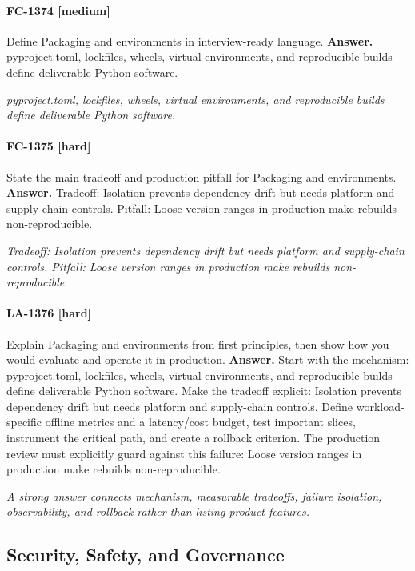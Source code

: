 \paragraph{FC-1374 [medium]} Define Packaging and environments in interview-ready language.
\noindent\textbf{Answer.} pyproject.toml, lockfiles, wheels, virtual environments, and reproducible builds define deliverable Python software.
\par\textit{pyproject.toml, lockfiles, wheels, virtual environments, and reproducible builds define deliverable Python software.}
\paragraph{FC-1375 [hard]} State the main tradeoff and production pitfall for Packaging and environments.
\noindent\textbf{Answer.} Tradeoff: Isolation prevents dependency drift but needs platform and supply-chain controls. Pitfall: Loose version ranges in production make rebuilds non-reproducible.
\par\textit{Tradeoff: Isolation prevents dependency drift but needs platform and supply-chain controls. Pitfall: Loose version ranges in production make rebuilds non-reproducible.}
\paragraph{LA-1376 [hard]} Explain Packaging and environments from first principles, then show how you would evaluate and operate it in production.
\noindent\textbf{Answer.} Start with the mechanism: pyproject.toml, lockfiles, wheels, virtual environments, and reproducible builds define deliverable Python software. Make the tradeoff explicit: Isolation prevents dependency drift but needs platform and supply-chain controls. Define workload-specific offline metrics and a latency/cost budget, test important slices, instrument the critical path, and create a rollback criterion. The production review must explicitly guard against this failure: Loose version ranges in production make rebuilds non-reproducible.
\par\textit{A strong answer connects mechanism, measurable tradeoffs, failure isolation, observability, and rollback rather than listing product features.}
\subsection{Security, Safety, and Governance}
